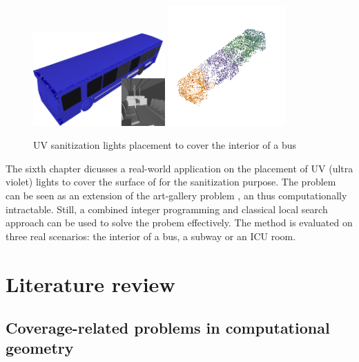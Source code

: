 \begin{figure}[ht]
    \centering
    \includegraphics[width = 0.45\textwidth]{chapters/surf/fig/bus.png}
    \hfill
    \includegraphics[width = 0.4\textwidth]{chapters/surf/fig/bus_result_3.png}
    \caption{UV sanitization lights placement to cover the interior of a bus}
    \label{fig:intro-surf}
\end{figure}

The sixth chapter dicusses a real-world application on the placement of UV (ultra violet) lights 
to cover the surface of for the sanitization purpose. The problem can be seen as an extension
of the art-gallery problem \cite{o1987art}, an thus computationally intractable.
Still, a combined integer programming and classical local search approach can be used to
solve the probem effectively. The method is evaluated on three real scenarios: 
the interior of a bus, a subway or an ICU room. 


\section{Literature review} 


\subsection{Coverage-related problems in computational geometry}

